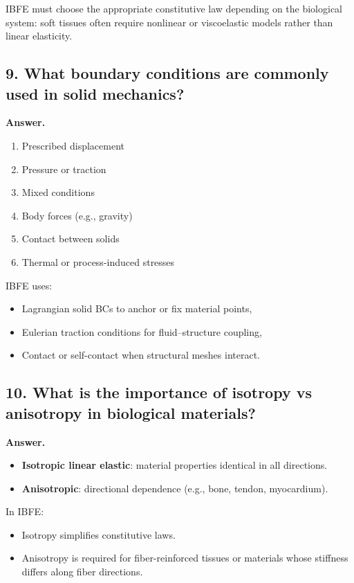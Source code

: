 \documentclass[12pt]{article}
\begin{document}
IBFE must choose the appropriate constitutive law depending on the biological system:
soft tissues often require nonlinear or viscoelastic models rather than linear elasticity.


\subsection*{9. What boundary conditions are commonly used in solid mechanics?}

\textbf{Answer.}

\begin{enumerate}
    \item Prescribed displacement
    \item Pressure or traction
    \item Mixed conditions
    \item Body forces (e.g., gravity)
    \item Contact between solids
    \item Thermal or process-induced stresses
\end{enumerate}

IBFE uses:
\begin{itemize}
    \item Lagrangian solid BCs to anchor or fix material points,
    \item Eulerian traction conditions for fluid–structure coupling,
    \item Contact or self-contact when structural meshes interact.
\end{itemize}


\subsection*{10. What is the importance of isotropy vs anisotropy in biological materials?}

\textbf{Answer.}

\begin{itemize}
    \item \textbf{Isotropic linear elastic}: material properties identical in all directions.
    \item \textbf{Anisotropic}: directional dependence (e.g., bone, tendon, myocardium).
\end{itemize}

In IBFE:
\begin{itemize}
    \item Isotropy simplifies constitutive laws.
    \item Anisotropy is required for fiber-reinforced tissues or materials whose stiffness differs along fiber directions.
\end{itemize}
\end{document}
